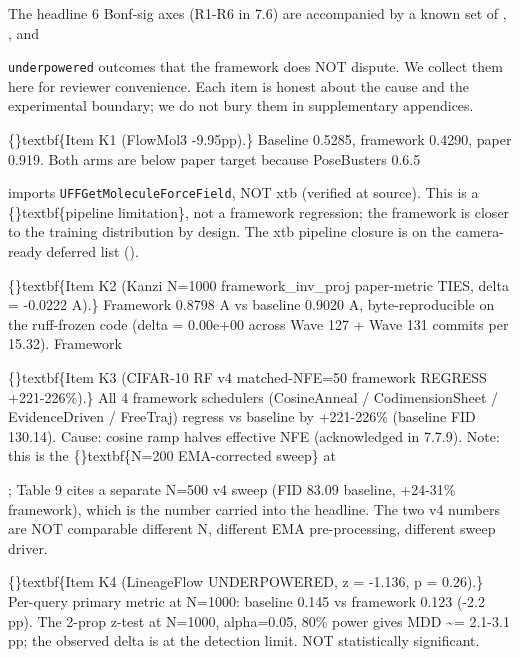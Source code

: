 \documentclass{article}
\begin{document}
The headline 6 Bonf-sig  axes (R1-R6 in 7.6) are accompanied by a known set of , , and

\texttt{underpowered} outcomes that the framework does NOT dispute. We collect them here for reviewer convenience. Each item is honest about the cause and the experimental boundary; we do not bury them in supplementary appendices.

\{\}textbf\{Item K1 (FlowMol3  -9.95pp).\} Baseline 0.5285, framework 0.4290, paper 0.919. Both arms are below paper target because PoseBusters 0.6.5

 imports \texttt{UFFGetMoleculeForceField}, NOT xtb (verified at source). This is a \{\}textbf\{pipeline limitation\}, not a framework regression; the framework is closer to the training distribution by design. The xtb pipeline closure is on the camera-ready deferred list ().

\{\}textbf\{Item K2 (Kanzi N=1000 framework\_inv\_proj paper-metric TIES, delta = -0.0222 A).\} Framework 0.8798 A vs baseline 0.9020 A, byte-reproducible on the ruff-frozen code (delta = 0.00e+00 across Wave 127 + Wave 131 commits per 15.32). Framework

\{\}textbf\{Item K3 (CIFAR-10 RF v4 matched-NFE=50 framework REGRESS +221-226\%).\} All 4 framework schedulers (CosineAnneal / CodimensionSheet / EvidenceDriven / FreeTraj) regress vs baseline by +221-226\% (baseline FID 130.14). Cause: cosine ramp halves effective NFE (acknowledged in 7.7.9). Note: this is the \{\}textbf\{N=200 EMA-corrected sweep\} at

; Table 9 cites a separate N=500 v4 sweep (FID 83.09 baseline, +24-31\% framework), which is the number carried into the headline. The two v4 numbers are NOT comparable  different N, different EMA pre-processing, different sweep driver.

\{\}textbf\{Item K4 (LineageFlow  UNDERPOWERED, z = -1.136, p = 0.26).\} Per-query primary metric at N=1000: baseline 0.145 vs framework 0.123 (-2.2 pp). The 2-prop z-test at N=1000, alpha=0.05, 80\% power gives MDD \textasciitilde{}= 2.1-3.1 pp; the observed delta is at the detection limit. NOT statistically significant.
\end{document}

